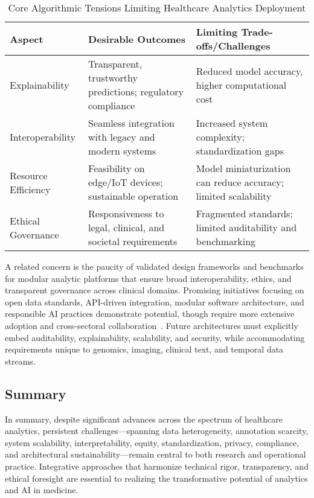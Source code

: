 \documentclass[sigconf]{acmart}
\begin{document}
\begin{table*}[htbp]
\centering
\caption{Core Algorithmic Tensions Limiting Healthcare Analytics Deployment}
\label{tab:algorithmic_tensions}
\begin{adjustbox}{max width=\textwidth}
\begin{tabular}{lll}
\toprule
\textbf{Aspect} & \textbf{Desirable Outcomes} & \textbf{Limiting Trade-offs/Challenges} \\
\midrule
Explainability & Transparent, trustworthy predictions; regulatory compliance & Reduced model accuracy, higher computational cost\\
Interoperability & Seamless integration with legacy and modern systems & Increased system complexity; standardization gaps\\
Resource Efficiency & Feasibility on edge/IoT devices; sustainable operation & Model miniaturization can reduce accuracy; limited scalability \\
Ethical Governance & Responsiveness to legal, clinical, and societal requirements & Fragmented standards; limited auditability and benchmarking\\
\bottomrule
\end{tabular}
\end{adjustbox}
\end{table*}

A related concern is the paucity of validated design frameworks and benchmarks for modular analytic platforms that ensure broad interoperability, ethics, and transparent governance across clinical domains. Promising initiatives focusing on open data standards, API-driven integration, modular software architecture, and responsible AI practices demonstrate potential, though require more extensive adoption and cross-sectoral collaboration~\cite{ref7, ref24, ref30, ref44, ref45, ref46, ref49, ref50, ref61, ref63, ref64, ref65, ref70, ref71, ref72, ref73, ref74, ref75, ref76, ref77, ref78, ref80, ref84, ref106, ref107}. Future architectures must explicitly embed auditability, explainability, scalability, and security, while accommodating requirements unique to genomics, imaging, clinical text, and temporal data streams.

\subsection{Summary}

In summary, despite significant advances across the spectrum of healthcare analytics, persistent challenges—spanning data heterogeneity, annotation scarcity, system scalability, interpretability, equity, standardization, privacy, compliance, and architectural sustainability—remain central to both research and operational practice. Integrative approaches that harmonize technical rigor, transparency, and ethical foresight are essential to realizing the transformative potential of analytics and AI in medicine.
\end{document}
